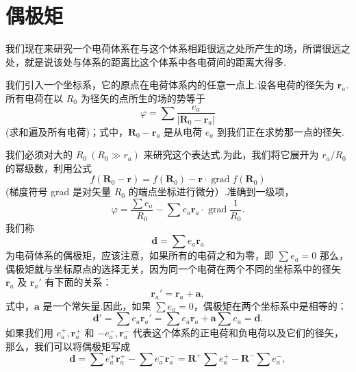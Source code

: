 \section{偶极矩}

我们现在来研究一个电荷体系在与这个体系相距很远之处所产生的场，所谓很远之处，就是说该处与体系的距离比这个体系中各电荷间的距离大得多.

我们引入一个坐标系，它的原点在电荷体系内的任意一点上.设各电荷的径矢为 $\boldsymbol{r}_a$.所有电荷在以 $R_0$ 为径矢的点所生的场的势等于
\begin{equation}
  \varphi=\sum\frac{e_a}{|\boldsymbol{R}_0-\boldsymbol{r}_a|}
\end{equation}
(求和遍及所有电荷)；式中，$\boldsymbol{R}_0-\boldsymbol{r}_a$ 是从电荷 $e_a$ 到我们正在求势那一点的径矢.

我们必须对大的 $R_0\ (R_0\gg r_a)$ 来研究这个表达式.为此，我们将它展开为 $r_a/R_0$ 的幂级数，利用公式
\begin{equation*}
  f(\boldsymbol{R}_0-\boldsymbol{r})=f(\boldsymbol{R}_0)
  -\boldsymbol{r}\cdot\operatorname{grad}f(\boldsymbol{R}_0)
\end{equation*}
(梯度符号 grad 是对矢量 $R_0$ 的端点坐标进行微分）.准确到一级项，
\begin{equation}
  \varphi=\frac{\sum e_a}{R_0}
  -\sum e_a\boldsymbol{r}_a\cdot\operatorname{grad}\frac{1}{R_0}.
\end{equation}
我们称
\begin{equation}
  \boldsymbol{d}=\sum e_a\boldsymbol{r}_a
\end{equation}
为电荷体系的偶极矩，应该注意，如果所有的电荷之和为零，即 $\sum e_a = 0$ 那么，偶极矩就与坐标原点的选择无关，因为同一个电荷在两个不同的坐标系中的径矢 $\boldsymbol{r}_a$ 及 $\boldsymbol{r}_a'$ 有下面的关系：
\begin{equation*}
  \boldsymbol{r}_a'=\boldsymbol{r}_a+\boldsymbol{a},
\end{equation*}
式中，$\boldsymbol{a}$ 是一个常矢量.因此，如果 $\sum e_a = 0$，偶极矩在两个坐标系中是相等的：
\begin{equation*}
  \boldsymbol{d}'=\sum e_a\boldsymbol{r}_a'
  =\sum e_a\boldsymbol{r}_a+\boldsymbol{a}\sum e_a=\boldsymbol{d}.
\end{equation*}
如果我们用 $e_a^+,\boldsymbol{r}_a^+$ 和 $-e_a^-,\boldsymbol{r}_a^-$ 代表这个体系的正电荷和负电荷以及它们的径矢，那么，我们可以将偶极矩写成
\begin{equation}
  \boldsymbol{d}=\sum e_a^+\boldsymbol{r}_a^+-\sum e_a^-\boldsymbol{r}_a^-
  =\boldsymbol{R}^+\sum e_a^+-\boldsymbol{R}^-\sum e_a^-,
\end{equation}
